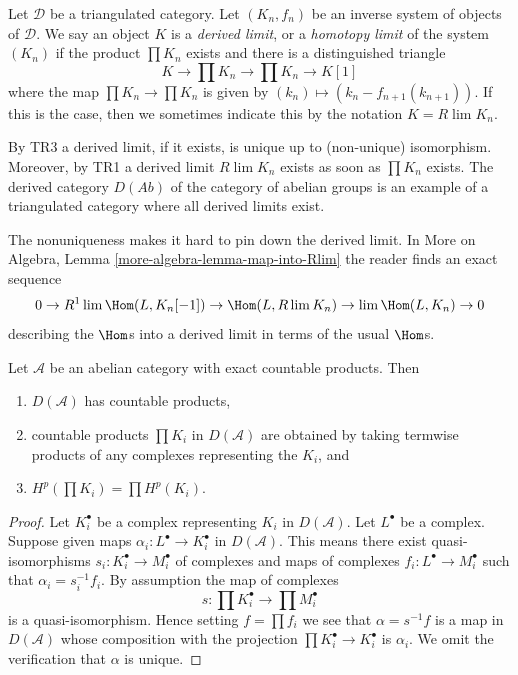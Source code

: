 \begin{definition}
\label{definition-derived-limit}
Let $\mathcal{D}$ be a triangulated category.
Let $(K_n, f_n)$ be an inverse system of objects of $\mathcal{D}$.
We say an object $K$ is a {\it derived limit}, or a
{\it homotopy limit} of the system $(K_n)$ if
the product $\prod K_n$ exists and there is a distinguished triangle
$$
K \to \prod K_n \to \prod K_n \to K[1]
$$
where the map $\prod K_n \to \prod K_n$ is given
by $(k_n) \mapsto (k_n - f_{n + 1}(k_{n + 1}))$. If this is the
case, then we sometimes indicate this by the notation $K = R\lim K_n$.
\end{definition}

\noindent
By TR3 a derived limit, if it exists, is unique up to (non-unique)
isomorphism. Moreover, by TR1 a derived limit $R\lim K_n$ exists
as soon as $\prod K_n$ exists. The derived category $D(\textit{Ab})$
of the category of abelian groups is an example of a triangulated category
where all derived limits exist.

\medskip\noindent
The nonuniqueness makes it hard to pin down the derived limit. In
More on Algebra, Lemma \ref{more-algebra-lemma-map-into-Rlim}
the reader finds an exact sequence
$$
0 \to R^1\lim \Hom(L, K_n[-1]) \to \Hom(L, R\lim K_n)
\to \lim \Hom(L, K_n) \to 0
$$
describing the $\Hom$s into a derived limit in terms of the
usual $\Hom$s.

\begin{lemma}
\label{lemma-products}
Let $\mathcal{A}$ be an abelian category with exact
countable products. Then
\begin{enumerate}
\item $D(\mathcal{A})$ has countable products,
\item countable products $\prod K_i$ in $D(\mathcal{A})$ are obtained by
taking termwise products of any complexes representing the $K_i$, and
\item $H^p(\prod K_i) = \prod H^p(K_i)$.
\end{enumerate}
\end{lemma}

\begin{proof}
Let $K_i^\bullet$ be a complex representing $K_i$ in $D(\mathcal{A})$.
Let $L^\bullet$ be a complex. Suppose given maps
$\alpha_i : L^\bullet \to K_i^\bullet$ in $D(\mathcal{A})$.
This means there exist quasi-isomorphisms $s_i : K_i^\bullet \to M_i^\bullet$
of complexes and maps of complexes $f_i : L^\bullet \to M_i^\bullet$
such that $\alpha_i = s_i^{-1}f_i$. By assumption the map of complexes
$$
s : \prod K_i^\bullet \longrightarrow \prod M_i^\bullet
$$
is a quasi-isomorphism. Hence setting $f = \prod f_i$ we see that
$\alpha = s^{-1}f$ is a map in $D(\mathcal{A})$ whose composition
with the projection $\prod K_i^\bullet \to K_i^\bullet$ is $\alpha_i$.
We omit the verification that $\alpha$ is unique.
\end{proof}

